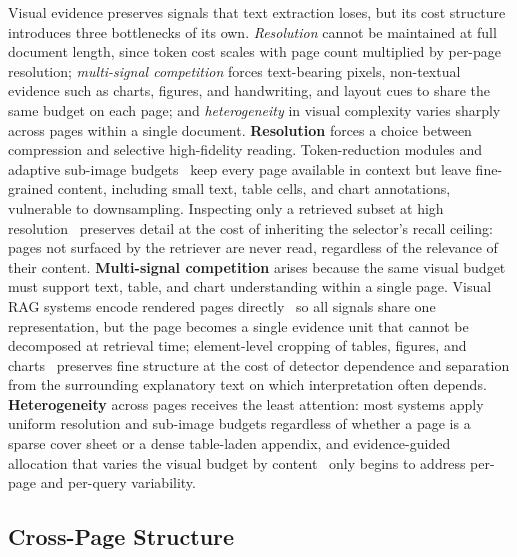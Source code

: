 \documentclass[11pt]{article}
\begin{document}
Visual evidence preserves signals that text extraction loses, but its cost structure introduces three bottlenecks of its own. \emph{Resolution} cannot be maintained at full document length, since token cost scales with page count multiplied by per-page resolution; \emph{multi-signal competition} forces text-bearing pixels, non-textual evidence such as charts, figures, and handwriting, and layout cues to share the same budget on each page; and \emph{heterogeneity} in visual complexity varies sharply across pages within a single document. \textbf{Resolution} forces a choice between compression and selective high-fidelity reading. Token-reduction modules and adaptive sub-image budgets~\cite{hu2025mplugdocowl2,yu2024texthawk2,jia2024leopard} keep every page available in context but leave fine-grained content, including small text, table cells, and chart annotations, vulnerable to downsampling. Inspecting only a retrieved subset at high resolution~\cite{zhu2025doclens,yan2025docseeker,jain2025simpledoc} preserves detail at the cost of inheriting the selector's recall ceiling: pages not surfaced by the retriever are never read, regardless of the relevance of their content. \textbf{Multi-signal competition} arises because the same visual budget must support text, table, and chart understanding within a single page. Visual RAG systems encode rendered pages directly~\cite{cho2024m3docrag,tanaka2025vdocrag} so all signals share one representation, but the page becomes a single evidence unit that cannot be decomposed at retrieval time; element-level cropping of tables, figures, and charts~\cite{zhu2025doclens} preserves fine structure at the cost of detector dependence and separation from the surrounding explanatory text on which interpretation often depends. \textbf{Heterogeneity} across pages receives the least attention: most systems apply uniform resolution and sub-image budgets regardless of whether a page is a sparse cover sheet or a dense table-laden appendix, and evidence-guided allocation that varies the visual budget by content~\cite{yan2025docseeker,jia2024leopard} only begins to address per-page and per-query variability.

\subsection{Cross-Page Structure}
\label{sec:modality-structure}
\end{document}
